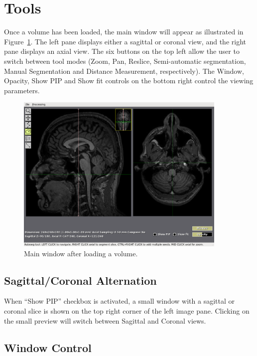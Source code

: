 \documentclass[12pt]{report}
\begin{document}
\section{Tools}

Once a volume has been loaded, the main window will appear as
illustrated in Figure~\ref{f.main}.  The left pane displays either a
sagittal or coronal view, and the right pane displays an axial
view. The six buttons on the top left allow the user to switch between
tool modes (Zoom, Pan, Reslice, Semi-automatic segmentation, Manual
Segmentation and Distance Measurement, respectively).  The Window,
Opacity, Show PIP and Show fit controls on the bottom right control
the viewing parameters.

\begin{figure}[!htb]
\begin{center}
\includegraphics[width=0.90\textwidth]{main.eps}
\caption{Main window after loading a volume.}
\label{f.main}
\end{center}
\end{figure}

\subsection{Sagittal/Coronal Alternation}

When ``Show PIP'' checkbox is activated, a small window with a
sagittal or coronal slice is shown on the top right corner of the left
image pane. Clicking on the small preview will switch between Sagittal
and Coronal views.

\subsection{Window Control}
\end{document}
